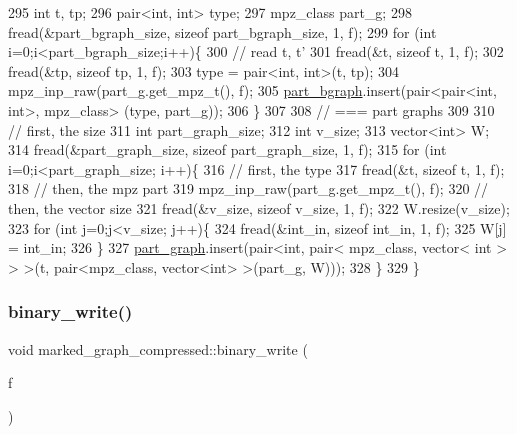 \begin{DoxyCode}
295   \textcolor{keywordtype}{int} t, tp;
296   pair<int, int> type; 
297   mpz\_class part\_g; 
298   fread(&part\_bgraph\_size, \textcolor{keyword}{sizeof} part\_bgraph\_size, 1, f);
299   \textcolor{keywordflow}{for} (\textcolor{keywordtype}{int} i=0;i<part\_bgraph\_size;i++)\{
300     \textcolor{comment}{// read t, t'}
301     fread(&t, \textcolor{keyword}{sizeof} t, 1, f);
302     fread(&tp, \textcolor{keyword}{sizeof} tp, 1, f);
303     type = pair<int, int>(t, tp);
304     mpz\_inp\_raw(part\_g.get\_mpz\_t(), f);
305     \hyperlink{classmarked__graph__compressed_a7b3267063fba30b45eb21b3ba4e07536}{part\_bgraph}.insert(pair<pair<int, int>, mpz\_class> (type, part\_g));
306   \}
307 
308   \textcolor{comment}{// === part graphs}
309 
310   \textcolor{comment}{// first, the size}
311   \textcolor{keywordtype}{int} part\_graph\_size;
312   \textcolor{keywordtype}{int} v\_size;
313   vector<int> W; 
314   fread(&part\_graph\_size, \textcolor{keyword}{sizeof} part\_graph\_size, 1, f);
315   \textcolor{keywordflow}{for} (\textcolor{keywordtype}{int} i=0;i<part\_graph\_size; i++)\{
316     \textcolor{comment}{// first, the type}
317     fread(&t, \textcolor{keyword}{sizeof} t, 1, f);
318     \textcolor{comment}{// then, the mpz part}
319     mpz\_inp\_raw(part\_g.get\_mpz\_t(), f);
320     \textcolor{comment}{// then, the vector size}
321     fread(&v\_size, \textcolor{keyword}{sizeof} v\_size, 1, f);
322     W.resize(v\_size);
323     \textcolor{keywordflow}{for} (\textcolor{keywordtype}{int} j=0;j<v\_size; j++)\{
324       fread(&int\_in, \textcolor{keyword}{sizeof} int\_in, 1, f);
325       W[j] = int\_in;
326     \}
327     \hyperlink{classmarked__graph__compressed_ae179a4737e6eab905c18a94d44ef64b7}{part\_graph}.insert(pair<\textcolor{keywordtype}{int}, pair< mpz\_class, vector< int > > >(t, pair<mpz\_class, vector<int>
       >(part\_g, W)));
328   \}
329 \}
\end{DoxyCode}
\mbox{\label{classmarked__graph__compressed_ab9cdb7fc43badd58fb5202f74ffac723}} 
\subsubsection{\texorpdfstring{binary\+\_\+write()}{binary\_write()}}
{\footnotesize\ttfamily void marked\+\_\+graph\+\_\+compressed\+::binary\+\_\+write (\begin{DoxyParamCaption}\item[{F\+I\+LE $\ast$}]{f }\end{DoxyParamCaption})}




